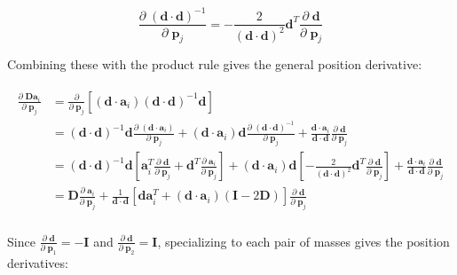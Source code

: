 \documentclass[]{article}
\newcommand{\pd}[2]{\frac{\partial\;#1}{\partial\;#2}}
\newcommand{\pddown}[2]{\frac{\partial}{\partial\;#2} \left[ #1 \right] }
\begin{document}
\begin{equation}
    \pd{(\mathbf{d} \cdot \mathbf{d})^{-1}}{\mathbf{p}_j} = -\frac{2}{(\mathbf{d} \cdot \mathbf{d})^2} \mathbf{d}^T \pd{\mathbf{d}}{\mathbf{p}_j}
\end{equation}

Combining these with the product rule gives the general position derivative:

\begin{align}
\begin{split}
    \pd{\mathbf{D} \mathbf{a}_i}{\mathbf{p}_j}
    &= \pddown{(\mathbf{d} \cdot \mathbf{a}_i) (\mathbf{d} \cdot \mathbf{d})^{-1} \mathbf{d}}{\mathbf{p}_j} \\
    &= (\mathbf{d} \cdot \mathbf{d})^{-1} \mathbf{d} \pd{(\mathbf{d} \cdot \mathbf{a}_i)}{\mathbf{p}_j} + (\mathbf{d} \cdot \mathbf{a}_i) \mathbf{d} \pd{(\mathbf{d} \cdot \mathbf{d})^{-1}}{\mathbf{p}_j} + \frac{\mathbf{d}\cdot\mathbf{a}_i}{\mathbf{d} \cdot \mathbf{d}} \pd{\mathbf{d}}{\mathbf{p}_j} \\
    &= (\mathbf{d} \cdot \mathbf{d})^{-1} \mathbf{d} \left[ \mathbf{a}_i^T \pd{\mathbf{d}}{\mathbf{p}_j} + \mathbf{d}^T \pd{\mathbf{a}_i}{\mathbf{p}_j} \right] + (\mathbf{d} \cdot \mathbf{a}_i) \mathbf{d} \left[ -\frac{2}{(\mathbf{d} \cdot \mathbf{d})^2} \mathbf{d}^T \pd{\mathbf{d}}{\mathbf{p}_j} \right] + \frac{\mathbf{d}\cdot\mathbf{a}_i}{\mathbf{d} \cdot \mathbf{d}} \pd{\mathbf{d}}{\mathbf{p}_j} \\
    &= \mathbf{D} \pd{\mathbf{a}_i}{\mathbf{p}_j} + \frac{1}{\mathbf{d} \cdot \mathbf{d}} \left[ \mathbf{d} \mathbf{a}_i^T + (\mathbf{d}\cdot\mathbf{a}_i) (\mathbf{I} - 2 \mathbf{D}) \right] \pd{\mathbf{d}}{\mathbf{p}_j} \\
\end{split}
\end{align}

Since $\pd{\mathbf{d}}{\mathbf{p}_1} = -\mathbf{I}$ and $\pd{\mathbf{d}}{\mathbf{p}_2} = \mathbf{I}$, specializing to each pair of masses gives the position derivatives:
\end{document}

